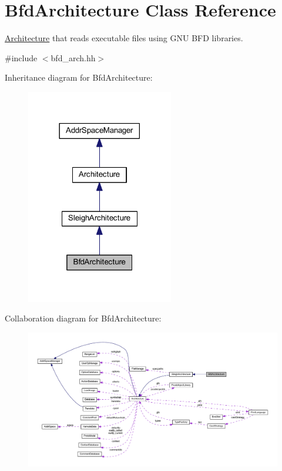 \hypertarget{class_bfd_architecture}{}\section{Bfd\+Architecture Class Reference}
\label{class_bfd_architecture}


\mbox{\hyperlink{class_architecture}{Architecture}} that reads executable files using G\+NU B\+FD libraries.  




{\ttfamily \#include $<$bfd\+\_\+arch.\+hh$>$}



Inheritance diagram for Bfd\+Architecture\+:
\nopagebreak
\begin{figure}[H]
\begin{center}
\leavevmode
\includegraphics[width=182pt]{class_bfd_architecture__inherit__graph}
\end{center}
\end{figure}


Collaboration diagram for Bfd\+Architecture\+:
\nopagebreak
\begin{figure}[H]
\begin{center}
\leavevmode
\includegraphics[width=350pt]{class_bfd_architecture__coll__graph}
\end{center}
\end{figure}
